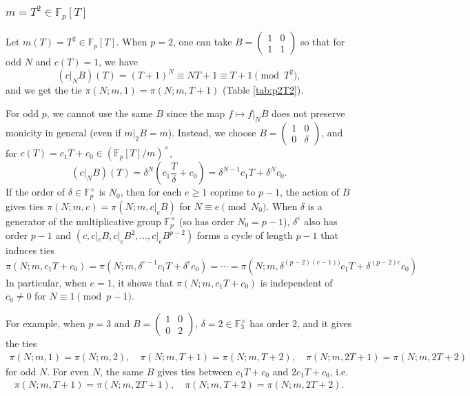\documentclass[10pt,reqno]{amsproc}
\newcommand{\bF}{\mathbb{F}}
\newcommand{\1}{\mathds{1}}	%
\theoremstyle{definition}
\theoremstyle{remark}
\begin{document}
\subsubsection{\texorpdfstring{\(m = T^2 \in \bF_p[T]\)}{m = T^2 over characteristic p}}
\label{subsubsec:T2}


Let $m(T) = T^2 \in \bF_p[T]$.
When $p = 2$, one can take $B = \left(\begin{smallmatrix}
    1 & 0 \\ 1 & 1
\end{smallmatrix}\right)$ so that for odd $N$ and $c(T) = 1$, we have
\[
(c|_{N}B)(T) = (T + 1)^N \equiv NT + 1 \equiv T + 1 \pmod{T^2},
\]
and we get the tie $\pi(N; m, 1) = \pi(N; m, T + 1)$ (Table \ref{tab:p2T2}).

For odd $p$, we cannot use the same $B$ since the map $f \mapsto f|_{N}B$ does not preserve monicity in general (even if $m|_2 B = m$).
Instead, we choose $B = \left(\begin{smallmatrix} 1 & 0 \\ 0 & \delta\end{smallmatrix}\right)$, and for $c(T) = c_1 T + c_0 \in (\bF_p[T] / m)^\times$,
\begin{equation}
    (c|_N B)(T) = \delta^N \left(c_1 \frac{T}{\delta} + c_0\right) = \delta^{N-1} c_1 T + \delta^N c_0.
\end{equation}
If the order of $\delta \in \bF_p^\times$ is $N_0$, then for each $e \ge 1$ coprime to $p - 1$, the action of $B$ gives ties $\pi(N; m, c) = \pi(N; m, c|_e B)$ for $N \equiv e \pmod{N_0}$.
When $\delta$ is a generator of the multiplicative group $\bF_p^\times$ (so has order $N_0 = p - 1$), $\delta^e$ also has order $p - 1$ and $(c, c|_e B, c|_e B^2, \dots, c|_e B^{p-2})$ forms a cycle of length $p-1$ that induces ties
\[
\pi(N; m, c_1 T + c_0) = \pi(N; m, \delta^{e - 1} c_1 T + \delta^e c_0) = \cdots = \pi(N; m, \delta^{(p-2)(e - 1))}c_1 T + \delta^{(p-2)e} c_0)
\]
In particular, when $e = 1$, it shows that $\pi(N; m, c_1 T + c_0)$ is independent of $c_0 \ne 0$ for $N \equiv 1 \pmod{p - 1}$.

For example, when $p = 3$ and $B = \left(\begin{smallmatrix} 1 & 0 \\ 0 & 2 \end{smallmatrix}\right)$, $\delta = 2 \in \bF_3^\times$ has order $2$, and it gives the ties
\begin{align*}
    \pi(N; m, 1) = \pi(N; m, 2), \quad \pi(N; m, T + 1) = \pi(N; m, T + 2), \quad \pi(N; m, 2T + 1) = \pi(N; m, 2T + 2)
\end{align*}
for odd $N$.
For even $N$, the same $B$ gives ties between $c_1 T + c_0$ and $2c_1 T + c_0$, i.e.
\begin{align*}
    \pi(N; m, T + 1) = \pi(N; m, 2T + 1), \quad \pi(N; m, T + 2) = \pi(N; m, 2T + 2).
\end{align*}
\end{document}

